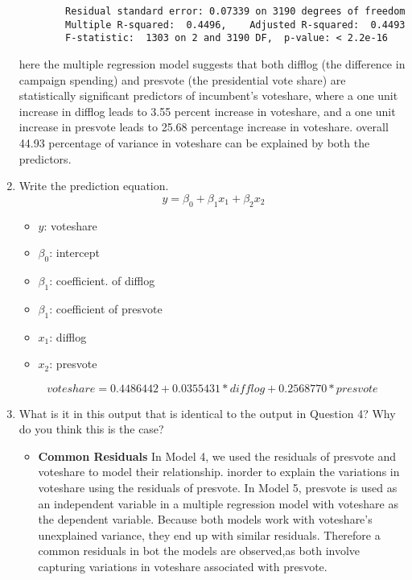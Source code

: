 \documentclass[12pt,letterpaper]{article}
\begin{document}
\begin{enumerate}
\begin{verbatim}
		Residual standard error: 0.07339 on 3190 degrees of freedom
		Multiple R-squared:  0.4496,	Adjusted R-squared:  0.4493 
		F-statistic:  1303 on 2 and 3190 DF,  p-value: < 2.2e-16
		\end{verbatim}
		here the multiple regression model  suggests that both difflog (the difference in campaign spending) and presvote (the presidential vote share) are statistically significant predictors of incumbent's voteshare, where a one unit increase in difflog leads to 3.55 percent increase in voteshare, and a one unit increase in presvote leads to 25.68 percentage increase in voteshare. overall 44.93 percentage of variance in voteshare can be explained by both the predictors.
		\vspace{0.2cm}
		\item Write the prediction equation.
		\begin{equation}
			\ y = \beta_0 + \beta_1 x_1+\beta_2 x_2
		\end{equation}
		\begin{itemize}
				\item \( y \): voteshare
				\item \(\beta_0\): intercept
				\item \(\beta_1 \): coefficient. of difflog
				\item \(\beta_1 \): coefficient of presvote
				\item \( x_1 \): difflog
				\item \( x_2 \): presvote
				\end{itemize}
			\begin{equation}
				voteshare= 0.4486442+0.0355431*difflog+0.2568770*presvote
			\end{equation}
			
			\vspace{0.2cm}
		\item What is it in this output that is identical to the output in Question 4? Why do you think this is the case?
		\begin{itemize}
			\item \textbf{Common Residuals}
			\newline
			In Model 4, we used the residuals of presvote and voteshare to model their relationship. inorder to explain the  variations in voteshare using the residuals of presvote. In Model 5, presvote is used as an independent variable in a multiple regression model with voteshare as the dependent variable. Because both models work with voteshare's unexplained variance, they end up with similar residuals. Therefore a common residuals in bot the models are observed,as both involve capturing variations in voteshare associated with presvote.

\end{itemize}
\end{enumerate}
\end{document}
